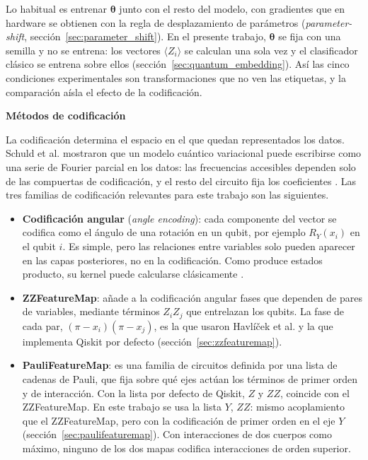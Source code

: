 Lo habitual es entrenar $\boldsymbol{\theta}$ junto con el resto del modelo, con gradientes que en hardware se obtienen con la regla de desplazamiento de parámetros (\textit{parameter-shift}, sección~\ref{sec:parameter_shift}). En el presente trabajo, $\boldsymbol{\theta}$ se fija con una semilla y no se entrena: los vectores $\langle Z_i \rangle$ se calculan una sola vez y el clasificador clásico se entrena sobre ellos (sección~\ref{sec:quantum_embedding}). Así las cinco condiciones experimentales son transformaciones que no ven las etiquetas, y la comparación aísla el efecto de la codificación.

\textbf{Métodos de codificación}

La codificación determina el espacio en el que quedan representados los datos.
Schuld et al. mostraron que un modelo cuántico variacional puede escribirse como una serie de Fourier parcial en los datos: las frecuencias accesibles dependen solo de las compuertas de codificación, y el resto del circuito fija los coeficientes \cite{Schuld2021Encoding}. Las tres familias de codificación relevantes para este trabajo son las siguientes.

\begin{itemize}
  \item \textbf{Codificación angular} (\textit{angle encoding}): cada componente del vector se codifica como el ángulo de una rotación en un qubit, por ejemplo $R_Y(x_i)$ en el qubit $i$. Es simple, pero las relaciones entre variables solo pueden aparecer en las capas posteriores, no en la codificación. Como produce estados producto, su kernel puede calcularse clásicamente \cite{havlicek2019supervised}.
  \item \textbf{ZZFeatureMap}: añade a la codificación angular fases que dependen de pares de variables, mediante términos $Z_iZ_j$ que entrelazan los qubits. La fase de cada par, $(\pi-x_i)(\pi-x_j)$, es la que usaron Havlíček et al. \cite{havlicek2019supervised} y la que implementa Qiskit por defecto (sección~\ref{sec:zzfeaturemap}).
  \item \textbf{PauliFeatureMap}: es una familia de circuitos definida por una lista de cadenas de Pauli, que fija sobre qué ejes actúan los términos de primer orden y de interacción. Con la lista por defecto de Qiskit, $Z$ y $ZZ$, coincide con el ZZFeatureMap. En este trabajo se usa la lista $Y$, $ZZ$: mismo acoplamiento que el ZZFeatureMap, pero con la codificación de primer orden en el eje $Y$ (sección~\ref{sec:paulifeaturemap}). Con interacciones de dos cuerpos como máximo, ninguno de los dos mapas codifica interacciones de orden superior.
\end{itemize}

